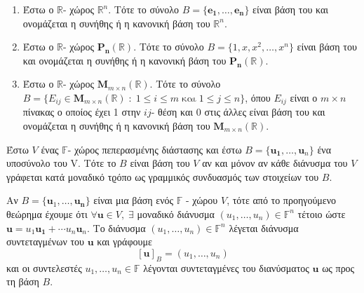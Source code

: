 \documentclass[a4paper,table]{report}
\begin{document}
\begin{examples}
\item {}
  \begin{enumerate}
    \item Έστω ο $ \mathbb{R} $- χώρος $ \mathbb{R}^{n} $. Τότε το σύνολο 
      $ B = \{ \mathbf{e_{1}}, \ldots, \mathbf{e_{n}} \} $ είναι βάση του και 
      ονομάζεται η συνήθης ή η κανονική βάση του $ \mathbb{R}^{n} $.
    \item Έστω ο $ \mathbb{R} $- χώρος $ \mathbf{P_{n}}(\mathbb{R}) $. Τότε το 
      σύνολο $ B = \{ 1, x, x^{2}, \ldots, x^{n} \} $ είναι βάση του και 
      ονομάζεται η συνήθης ή η κανονική βάση του $ \mathbf{P_{n}}(\mathbb{R}) $.
    \item Έστω ο $ \mathbb{R} $- χώρος $ \textbf{M}_{m \times n}(\mathbb{R}) $. 
      Τότε το σύνολο 
      $ B = \{ E_{ij} \in \textbf{M}_{m \times n}(\mathbb{R}) \; : \; 1 \leq i
      \leq m \; \text{και} \; 1 \leq j \leq n\}  $, όπου $ E _{ij} $ είναι ο 
      $ m \times n $ πίνακας ο οποίος έχει 1 στην $ ij $- θέση και 0 στις άλλες 
      είναι βάση του και ονομάζεται η συνήθης ή η κανονική βάση του 
      $ \textbf{M}_{m \times n}(\mathbb{R}) $.
  \end{enumerate}
\end{examples}

\begin{thm}
\item {}
  Έστω $V$ ένας $ \mathbb{F} $- χώρος πεπερασμένης διάστασης και έστω 
  $ B = \{ \mathbf{u_{1}}, \ldots, \mathbf{u}_{n} \} $ ένα υποσύνολο του V. Τότε 
  το $B$ είναι βάση του $V$ αν και μόνον αν κάθε διάνυσμα του $V$ γράφεται 
  κατά μοναδικό τϱόπο ως γραμμικός συνδυασμός των στοιχείων του $B$.
\end{thm}

\begin{rem}
  Αν $B = \{ \mathbf{u}_{1}, \ldots, \mathbf{u_{n}} \} $ είναι μια βάση ενός 
  $ \mathbb{F} $ - χώρου $V$, τότε από το προηγούμενο θεώρημα έχουμε ότι 
  $ \forall \mathbf{u} \in V, \; \exists $ μοναδικό διάνυσμα 
  $ (u_{1}, \ldots, u_{n}) \in \mathbb{F}^{n} $ τέτοιο ώστε 
  $ \mathbf{u} = u_{1} \mathbf{u_{1}} + \cdots u_{n} \mathbf{u}_{n} $. 
  Το διάνυσμα $ (u_{1}, \ldots, u_{n}) \in \mathbb{F}^{n} $ λέγεται 
  \textcolor{Col2}{διάνυσμα συντεταγμένων} του $ \mathbf{u} $ και γράφουμε 
  \[ 
    [\mathbf{u}]_{B} = (u_{1}, \ldots, u_{n})
\] 
και  οι συντελεστές $ u_{1}, \ldots, u_{n} \in \mathbb{F} $ λέγονται 
\textcolor{Col2}{συντεταγμένες} του διανύσματος $ \mathbf{u} $ ως προς τη βάση $B$.
\end{rem}
\end{document}
